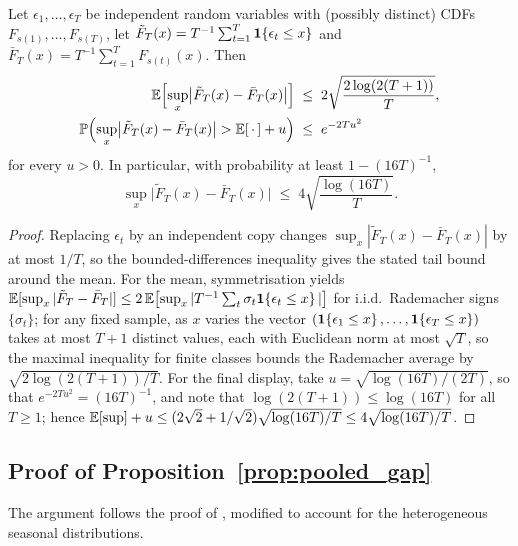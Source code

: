 \begin{lemma}
\label{lem:dkw_noniid}
Let $\epsilon_1, \ldots, \epsilon_T$ be independent random
variables with (possibly distinct) CDFs $F_{s(1)}, \ldots,
F_{s(T)}$, let
$\tilde{F}_T(x) = T^{-1}\sum_{t=1}^T \mathbf{1}\!\left\{\epsilon_t \leq x\right\}$
and $\bar{F}_T(x) = T^{-1}\sum_{t=1}^T F_{s(t)}(x)$.  Then
\begin{align*}
  \mathbb{E}\Bigl[\sup_x \bigl|\tilde{F}_T(x) - \bar{F}_T(x)\bigr|\Bigr]
  &\;\leq\; 2\sqrt{\frac{2\log(2(T+1))}{T}}, \\
  \mathbb{P}\Bigl(\sup_x \bigl|\tilde{F}_T(x) - \bar{F}_T(x)\bigr|
  > \mathbb{E}[\,\cdot\,] + u\Bigr)
  &\;\leq\; e^{-2Tu^2}
\end{align*}
for every $u > 0$.  In particular, with probability at least
$1 - (16T)^{-1}$,
\[
  \sup_x \bigl|\tilde{F}_T(x) - \bar{F}_T(x)\bigr|
  \;\leq\;
  4\sqrt{\frac{\log(16T)}{T}}.
\]
\end{lemma}

\begin{proof}
Replacing $\epsilon_t$ by an independent copy changes
$\sup_x|\tilde{F}_T(x) - \bar{F}_T(x)|$ by at most $1/T$, so the
bounded-differences inequality gives the stated tail bound around
the mean.  For the mean, symmetrisation yields
$\mathbb{E}[\sup_x|\tilde{F}_T - \bar{F}_T|]
\leq 2\,\mathbb{E}\bigl[\sup_x |T^{-1}\sum_t \sigma_t
\mathbf{1}\!\left\{\epsilon_t \leq x\right\}|\bigr]$
for i.i.d.\ Rademacher signs $\{\sigma_t\}$; for any fixed sample,
as $x$ varies the vector
$(\mathbf{1}\!\left\{\epsilon_1 \leq x\right\}, \ldots, \mathbf{1}\!\left\{\epsilon_T \leq x\right\})$
takes at most $T+1$ distinct values, each with Euclidean norm at
most $\sqrt{T}$, so the maximal inequality for finite classes
\citep[see][]{boucheron2013concentration}
bounds the Rademacher average by $\sqrt{2\log(2(T+1))/T}$.
For the final display, take $u = \sqrt{\log(16T)/(2T)}$, so that
$e^{-2Tu^2} = (16T)^{-1}$, and note that
$\log(2(T+1)) \leq \log(16T)$ for all $T \geq 1$; hence
$\mathbb{E}[\sup] + u \leq
(2\sqrt{2} + 1/\sqrt{2})\sqrt{\log(16T)/T}
\leq 4\sqrt{\log(16T)/T}$.
\end{proof}

\subsection{Proof of Proposition~\ref{prop:pooled_gap}}
\label{app:proofs:prop_pooled}

The argument follows the proof of
\citet[Theorem~1]{xu2023conformal}, modified to account for the
heterogeneous seasonal distributions.

